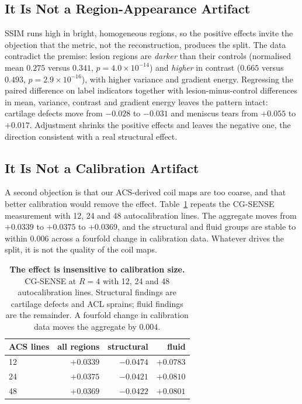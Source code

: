 \documentclass[letterpaper]{article} %
\begin{document}
\subsection{It Is Not a Region-Appearance Artifact}
SSIM runs high in bright, homogeneous regions, so the positive effects invite
the objection that the metric, not the reconstruction, produces the split. The
data contradict the premise: lesion regions are \emph{darker} than their
controls (normalised mean $0.275$ versus $0.341$, $p{=}4.0\times10^{-14}$) and
\emph{higher} in contrast ($0.665$ versus $0.493$, $p{=}2.9\times10^{-16}$),
with higher variance and gradient energy. Regressing the paired difference on
label indicators together with lesion-minus-control differences in mean,
variance, contrast and gradient energy leaves the pattern intact: cartilage
defects move from $-0.028$ to $-0.031$ and meniscus tears from $+0.055$ to
$+0.017$. Adjustment shrinks the positive effects and leaves the negative one,
the direction consistent with a real structural effect.

\subsection{It Is Not a Calibration Artifact}
A second objection is that our ACS-derived coil maps are too coarse, and that
better calibration would remove the effect. Table~\ref{tab:acs} repeats the
CG-SENSE measurement with 12, 24 and 48 autocalibration lines. The aggregate
moves from $+0.0339$ to $+0.0375$ to $+0.0369$, and the structural and fluid
groups are stable to within $0.006$ across a fourfold change in calibration
data. Whatever drives the split, it is not the quality of the coil maps.

\begin{table}[t]
\centering
\small
\begin{tabular}{lrrr}
\toprule
ACS lines & all regions & structural & fluid \\
\midrule
12 & $+0.0339$ & $-0.0474$ & $+0.0783$ \\
24 & $+0.0375$ & $-0.0421$ & $+0.0810$ \\
48 & $+0.0369$ & $-0.0422$ & $+0.0801$ \\
\bottomrule
\end{tabular}
\caption{\textbf{The effect is insensitive to calibration size.} CG-SENSE at
$R{=}4$ with 12, 24 and 48 autocalibration lines. Structural findings are
cartilage defects and ACL sprains; fluid findings are the remainder. A fourfold
change in calibration data moves the aggregate by $0.004$.}
\label{tab:acs}
\end{table}
\end{document}
